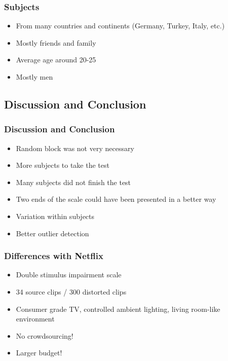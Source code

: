 \documentclass{beamer}
\begin{document}
\begin{frame}
   \frametitle{Subjects}
   \begin{itemize}
      \item From many countries and continents (Germany, Turkey, Italy, etc.)
      \item Mostly friends and family
      \item Average age around 20-25
      \item Mostly men      
     \end{itemize}
\end{frame}



\subsection{Discussion and Conclusion}
\begin{frame}
   \frametitle{Discussion and Conclusion}
   \begin{itemize}
   		\item Random block was not very necessary
   		\item More subjects to take the test
   		\item Many subjects did not finish the test
   		\item Two ends of the scale could have been presented in a better way
   		\item Variation within subjects 
        \item Better outlier detection
   \end{itemize}
\end{frame}

\begin{frame}
	\frametitle{Differences with Netflix}
    \begin{itemize}
    \item Double stimulus impairment scale
    \item 34 source clips / 300 distorted clips
    \item Consumer grade TV, controlled ambient lighting, living room-like environment
    \item No crowdsourcing!
    \item Larger budget!
    \end{itemize}
\end{frame}
\end{document}
